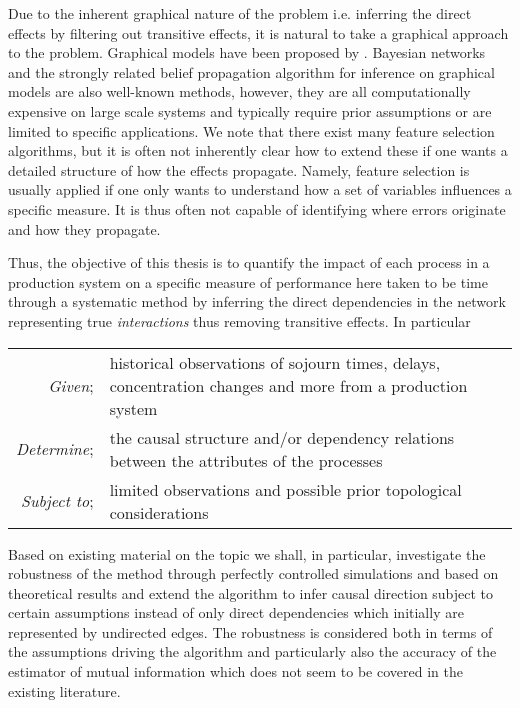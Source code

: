 \documentclass[../Thesis.tex]{subfiles}
\begin{document}
Due to the inherent graphical nature of the problem i.e. inferring the direct effects by filtering out transitive effects, it is natural to take a graphical approach to the problem. Graphical models have been proposed by \cite{1601981848}. Bayesian networks \cite{1581131860} \cite{Inferring_Cellular_Networks_Using_Probabilistic_Graphical_Models} and the strongly related belief propagation algorithm for inference on graphical models \cite{Identification_of_direct_residue_contacts_in_protein-protein_interaction_by_message_passing} are also well-known methods, however, they are all computationally expensive on large scale systems and typically require prior assumptions or are limited to specific applications. We note that there exist many feature selection algorithms, but it is often not inherently clear how to extend these if one wants a detailed structure of how the effects propagate. Namely, feature selection is usually applied if one only wants to understand how a set of variables influences a specific measure. It is thus often not capable of identifying where errors originate and how they propagate.


Thus, the objective of this thesis is to quantify the impact of each process in a production system on a specific measure of performance here taken to be time through a systematic method by inferring the direct dependencies in the network representing true \textit{interactions} thus removing transitive effects. In particular

\begin{table}[h]
    \begin{tabularx}{\textwidth}{rX}
        \textit{Given};      & historical observations of sojourn times, delays, concentration changes and more from a production system\\
        \textit{Determine};  & the causal structure and/or dependency relations between the attributes of the processes                              \\
        \textit{Subject to}; & limited observations and possible prior topological considerations                                                    \\
    \end{tabularx}
\end{table}

Based on existing material on the topic \cite{Network-deconvolution-as-a-general-method-to-distinguish-direct-dependencies-in-networks} \cite{Nonparametric-copula-entropy-and-network-deconvolution-method-for-causal-discovery-in-complex-manufacturing-systems} \cite{An_effective_approach_for_causal_variables_analysis_in_diesel_engine_production_by_using_mutual_information_and_network_deconvolution} we shall, in particular, investigate the robustness of the method through perfectly controlled simulations and based on theoretical results and extend the algorithm to infer causal direction subject to certain assumptions instead of only direct dependencies which initially are represented by undirected edges. The robustness is considered both in terms of the assumptions driving the algorithm and particularly also the accuracy of the estimator of mutual information which does not seem to be covered in the existing literature.
\end{document}
